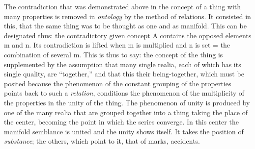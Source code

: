 The contradiction that was demonstrated above in the concept of a thing
with many properties is removed in \emph{ontology} by the method of
relations. It consisted in this, that the same thing was to be thought as
one and as manifold. This can be designated thus: the contradictory given
concept A contains the opposed elements m and n. Its contradiction is
lifted when m is multiplied and n is set = the combination of several m.
This is thus to say: the concept of the thing is supplemented by the
assumption that many single realia, each of which has its single quality,
are ``together,'' and that this their being-together, which must be
posited because the phenomenon of the constant grouping of the properties
points back to such a \emph{relation}, conditions the phenomenon of the
multiplicity of the properties in the unity of the thing. The phenomenon
of unity is produced by one of the many realia that are grouped together
into a thing taking the place of the center, becoming the point in which
the series converge. In this center the manifold semblance is united and
the unity shows itself. It takes the position of \emph{substance}; the
others, which point to it, that of marks, accidents.


